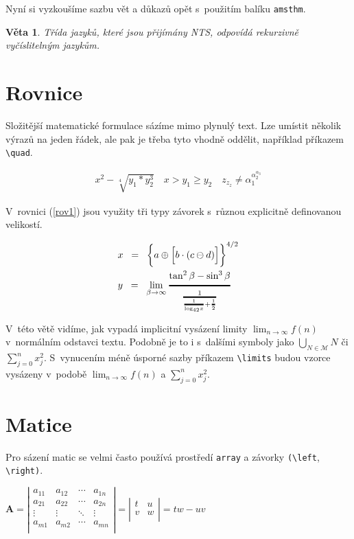 \documentclass[twocolumn,11pt,a4paper]{article}
\newtheorem{veta}{Věta}
\begin{document}
Nyní si vyzkoušíme sazbu vět a důkazů opět s~použitím balíku \verb=amsthm=.

\begin{veta}
Třída jazyků, které jsou přijímány NTS, odpovídá \textup{rekurzivně vyčíslitelným jazykům.}
\end{veta}

\section{Rovnice}
\label{rov}

Složitější matematické formulace sázíme mimo plynulý text. Lze umístit několik výrazů na jeden řádek, ale pak je třeba tyto vhodně oddělit, například příkazem \verb=\quad=.

\begin{align}
x^2 - \sqrt[4]{y_1 * y_2^3} \quad x > y_1 \geq y_2 \quad z_{z_z} \neq \alpha_1^{\alpha_2^{\alpha_3}}\nonumber
\end{align}

V~rovnici (\ref{rov1}) jsou využity tři typy závorek s~různou explicitně definovanou velikostí.

\begin{align}\label{rov1}
    & x \;\;=\;\; \bigg\{a\oplus\Big[b \cdot (c\ominus d)\Big]\bigg\}^{4\slash 2}\\
    & y \;\;=\;\; \displaystyle\lim_{\beta \to \infty}\genfrac{}{}{1.5pt}{}{\mathrm{tan}^2\,\beta - \mathrm{sin}^3\,\beta}{\genfrac{}{}{1.5pt}{}{1}{\genfrac{}{}{1.5pt}{}{1}{\mathrm{log}_{42} x}+\genfrac{}{}{1.5pt}{}{1}{2}}}
\end{align}

V~této větě vidíme, jak vypadá implicitní vysázení li\-mity $\lim_{n \to \infty}f(n)$ v~normálním odstavci textu. Podobně je to i s~dalšími symboly jako $\bigcup_{N \in \mathcal{M}}N$ či $\sum_{j=0}^n x_j^2$. 
S~vy\-nucením méně úsporné sazby příkazem \verb=\limits= budou vzorce vysázeny v~podobě $\displaystyle\lim_{n 
\to \infty}f(n)$ a $\sum\limits_{j=0}^n x_j^2$.

\section{Matice}

Pro sázení matic se velmi často používá prostředí \verb=array= a závorky \verb=(\left=, \verb=\right)=. 

\bigskip
\bigskip

\noindent$\textbf{A} = 
\left|
\begin{array}{cccc}
    a_{11} & a_{12} & \cdots & a_{1n}\\
    a_{21} & a_{22} & \cdots & a_{2n}\\
    \vdots & \vdots & \ddots & \vdots\\
    a_{m1} & a_{m2} & \cdots & a_{mn}\\
\end{array}\right| = 
\left|
\begin{array}{cc}
    t & u\\
    v & w\\
\end{array}\right|
= tw - uv$
\end{document}
